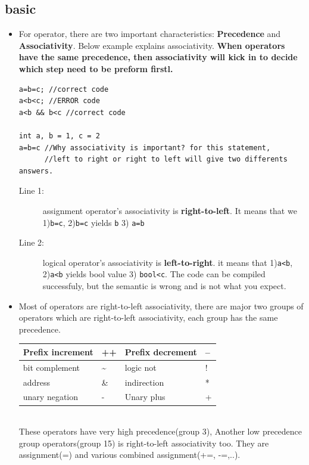 \documentclass[a4paper,11pt,twoside]{book}
\newcommand{\tophline}{\hline }
\newcommand{\bottomhline}{\\ \hline }
\newcommand{\tophline}{ }
\newcommand{\bottomhline}{ }
\begin{document}
\subsection{basic}
\begin{itemize}
	\item For operator, there are two important characteristics: \textbf{Precedence} and \textbf{Associativity}. Below example explains associativity. \textbf{When operators have the same precedence, then associativity will kick in to decide which step need to be preform firstl.}
	
\begin{lstlisting}
a=b=c; //correct code
a<b<c; //ERROR code
a<b && b<c //correct code

int a, b = 1, c = 2
a=b=c //Why associativity is important? for this statement, 
      //left to right or right to left will give two differents answers. 
\end{lstlisting}

\begin{description}
	\item[Line 1:] assignment operator's associativity is \textbf{right-to-left}. It means that we 1)\texttt{b=c}, 2)\texttt{b=c} yields \texttt{b} 3) \texttt{a=b} 
	
	\item[Line 2:] logical operator's associativity is \textbf{left-to-right}. it means that 1)\texttt{a<b}, 2)\texttt{a<b} yields bool value 3) \texttt{bool<c}. The code can be compiled successfuly, but the semantic is wrong and is not what you expect.  
\end{description}

    \item Most of operators are right-to-left associativity, there are major two groups of operators which are right-to-left associativity, each group has the same precedence.

\begin{tabular}{|p{}|p{}|p{}|p{}|}
	\tophline
    Prefix increment & ++ & Prefix decrement & --\\
	\tophline
    bit complement & \~{} & logic not & ! \\
	\tophline
    address & \& & indirection & * \\
	\tophline
    unary negation & - & Unary plus & +
	\bottomhline
\end{tabular} \\
These operators have very high precedence(group 3), Another low precedence group operators(group 15) is right-to-left associativity too. They are assignment(=) and various combined assignment(+=, -=,..).


\end{itemize}
\end{document}

